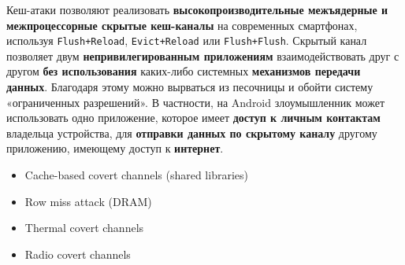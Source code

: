 \begin{frame}{\insertsubsection}
{    Кеш-атаки позволяют реализовать \textbf{высокопроизводительные межъядерные и
      межпроцессорные скрытые кеш-каналы} на современных смартфонах, используя
    \texttt{Flush+Reload}, \texttt{Evict+Reload} или \texttt{Flush+Flush}.
    Скрытый канал позволяет двум \textbf{непривилегированным приложениям}
    взаимодействовать друг с другом \textbf{без использования} каких-либо
    системных \textbf{механизмов передачи данных}. Благодаря этому можно
    вырваться из песочницы и обойти систему «ограниченных разрешений». В
    частности, на Android злоумышленник может использовать одно приложение,
    которое имеет \textbf{доступ к личным контактам} владельца устройства, для
    \textbf{отправки данных по скрытому каналу} другому приложению, имеющему
    доступ к \textbf{интернет}.

  }

\end{frame}

\begin{frame}{\insertsubsection}
  \begin{itemize}
  \item Cache-based covert channels (shared libraries)
  \item Row miss attack (DRAM)
  \item Thermal covert channels
  \item Radio covert channels
  \end{itemize}

\end{frame}


